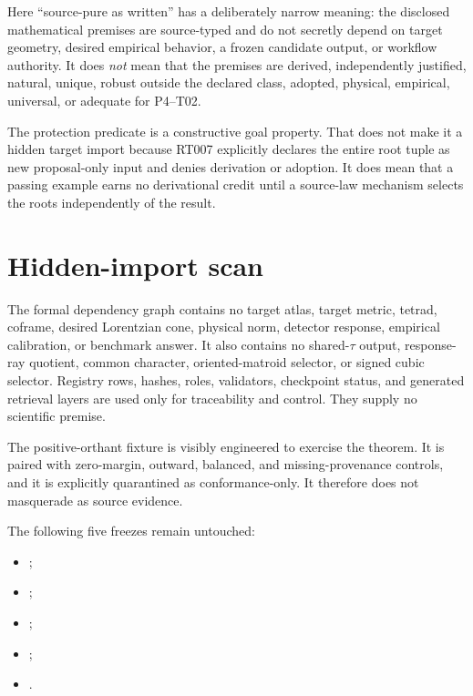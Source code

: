 \documentclass[11pt]{article}
\begin{document}
Here ``source-pure as written'' has a deliberately narrow meaning: the
disclosed mathematical premises are source-typed and do not secretly depend
on target geometry, desired empirical behavior, a frozen candidate output, or
workflow authority.  It does \emph{not} mean that the premises are derived,
independently justified, natural, unique, robust outside the declared class,
adopted, physical, empirical, universal, or adequate for P4--T02.

The protection predicate is a constructive goal property.  That does not
make it a hidden target import because RT007 explicitly declares the entire
root tuple as new proposal-only input and denies derivation or adoption.  It
does mean that a passing example earns no derivational credit until a
source-law mechanism selects the roots independently of the result.

\section{Hidden-import scan}

The formal dependency graph contains no target atlas, target metric, tetrad,
coframe, desired Lorentzian cone, physical norm, detector response, empirical
calibration, or benchmark answer.  It also contains no shared-\(\tau\) output,
response-ray quotient, common character, oriented-matroid selector, or signed
cubic selector.  Registry rows, hashes, roles, validators, checkpoint status,
and generated retrieval layers are used only for traceability and control.
They supply no scientific premise.

The positive-orthant fixture is visibly engineered to exercise the theorem.
It is paired with zero-margin, outward, balanced, and missing-provenance
controls, and it is explicitly quarantined as conformance-only.  It therefore
does not masquerade as source evidence.

The following five freezes remain untouched:
\begin{itemize}
  \item {};
  \item {};
  \item {};
  \item {};
  \item {}.
\end{itemize}
\end{document}
